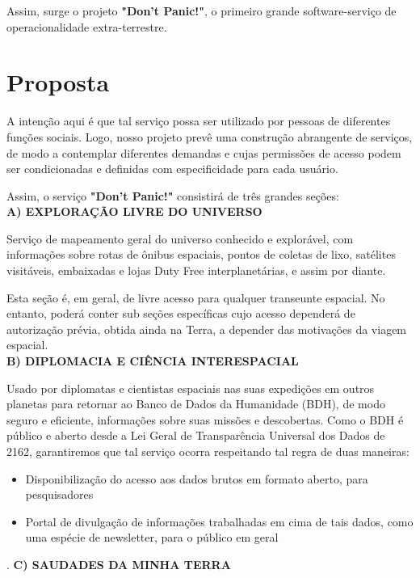 \documentclass[12pt]{exam}
\begin{document}
    Assim, surge o projeto \textbf{"Don't Panic!"}, o primeiro grande software-serviço de operacionalidade extra-terrestre. 
	
\section{Proposta}

	A intenção aqui é que tal serviço possa ser utilizado por pessoas de diferentes funções sociais. Logo, nosso projeto prevê uma construção abrangente de serviços, de modo a contemplar diferentes demandas e cujas permissões de acesso podem ser condicionadas e definidas com especificidade para cada usuário. 
	
	Assim, o serviço \textbf{"Don't Panic!"} consistirá de três grandes seções: \\
	
    \textbf{A) EXPLORAÇÃO LIVRE DO UNIVERSO} 
    
    Serviço de mapeamento geral do universo conhecido e explorável, com informações sobre rotas de ônibus espaciais, pontos de coletas de lixo, satélites visitáveis, embaixadas e lojas Duty Free interplanetárias, e assim por diante. 
    
	Esta seção é, em geral, de livre acesso para qualquer transeunte espacial. No entanto, poderá conter sub seções específicas cujo acesso dependerá de autorização prévia, obtida ainda na Terra, a depender das motivações da viagem espacial.\\
    
    \textbf{B) DIPLOMACIA E CIÊNCIA INTERESPACIAL}
    
    Usado por diplomatas e cientistas espaciais nas suas expedições em outros planetas para retornar ao Banco de Dados da Humanidade (BDH), de modo seguro e eficiente, informações sobre suas missões e descobertas. Como o BDH é público e aberto desde a Lei Geral de Transparência Universal dos Dados de 2162, garantiremos que tal serviço ocorra respeitando tal regra de duas maneiras: 
	
	\begin{itemize}
	\item {Disponibilização do acesso aos dados brutos em formato aberto, para pesquisadores}
	\item {Portal de divulgação de informações trabalhadas em cima de tais dados, como uma espécie de newsletter, para o público em geral}
	\end{itemize}
.
	\textbf{C) SAUDADES DA MINHA TERRA}
    
\end{document}

